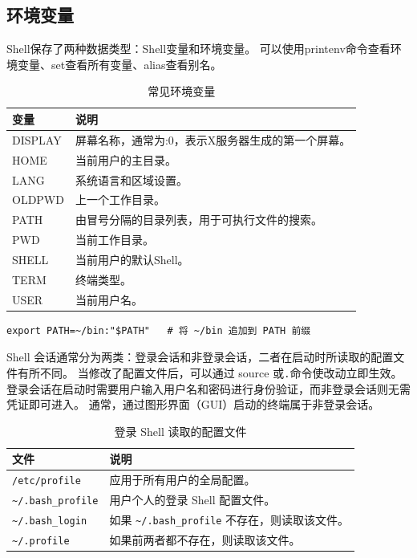 \subsection{环境变量}
Shell保存了两种数据类型：Shell变量和环境变量。
可以使用printenv命令查看环境变量、set查看所有变量、alias查看别名。
\begin{table}[H]
	\centering
	\begin{tabular}{|l|l|}
		\hline
		\textbf{变量} & \textbf{说明}                \\
		\hline
		DISPLAY     & 屏幕名称，通常为:0，表示X服务器生成的第一个屏幕。 \\
		\hline
		HOME        & 当前用户的主目录。                  \\
		\hline
		LANG        & 系统语言和区域设置。                 \\
		\hline
		OLDPWD      & 上一个工作目录。                   \\
		\hline
		PATH        & 由冒号分隔的目录列表，用于可执行文件的搜索。     \\
		\hline
		PWD         & 当前工作目录。                    \\
		\hline
		SHELL       & 当前用户的默认Shell。              \\
		\hline
		TERM        & 终端类型。                      \\
		\hline
		USER        & 当前用户名。                     \\
		\hline
	\end{tabular}
	\caption{常见环境变量}
\end{table}

\begin{code}[title=环境变量操作]
	\begin{verbatim}
export PATH=~/bin:"$PATH"   # 将 ~/bin 追加到 PATH 前缀
	\end{verbatim}
\end{code}

Shell 会话通常分为两类：登录会话和非登录会话，二者在启动时所读取的配置文件有所不同。
当修改了配置文件后，可以通过 source 或\verb|.|命令使改动立即生效。
登录会话在启动时需要用户输入用户名和密码进行身份验证，而非登录会话则无需凭证即可进入。
通常，通过图形界面（GUI）启动的终端属于非登录会话。
\begin{table}[H]
	\centering
	\begin{tabular}{|l|l|}
		\hline
		\textbf{文件}            & \textbf{说明}                           \\
		\hline
		\verb|/etc/profile|    & 应用于所有用户的全局配置。                         \\
		\hline
		\verb|~/.bash_profile| & 用户个人的登录 Shell 配置文件。                   \\
		\hline
		\verb|~/.bash_login|   & 如果 \verb|~/.bash_profile| 不存在，则读取该文件。 \\
		\hline
		\verb|~/.profile|      & 如果前两者都不存在，则读取该文件。                     \\
		\hline
	\end{tabular}
	\caption{登录 Shell 读取的配置文件}
\end{table}

